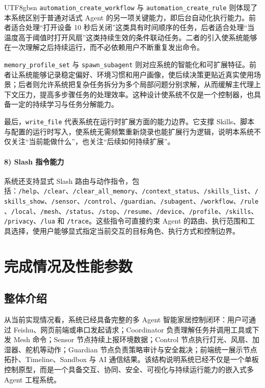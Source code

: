 \documentclass[a4paper,12pt]{article}
\begin{document}
\begin{CJK*}{UTF8}{gbsn}
\texttt{automation\_create\_workflow} 与 \texttt{automation\_create\_rule} 则体现了本系统区别于普通对话式 Agent 的另一项关键能力，即后台自动化执行能力。前者适合处理“打开设备 10 秒后关闭”这类具有时间顺序的任务，后者适合处理“当温度高于阈值时打开风扇”这类持续生效的条件联动任务。二者的引入使系统能够在一次理解之后持续运行，而不必依赖用户不断重复发出命令。

\texttt{memory\_profile\_set} 与 \texttt{spawn\_subagent} 则对应系统的智能化和可扩展特征。前者让系统能够记录稳定偏好、环境习惯和用户画像，使后续决策更贴近真实使用场景；后者则允许系统把复杂任务拆分为多个局部问题分别求解，从而缓解主代理上下文压力，提高多步骤任务的处理效率。这种设计使系统不仅是一个控制器，也具备一定的持续学习与任务分解能力。

最后，\texttt{write\_file} 代表系统在运行时扩展方面的能力边界。它支撑 Skills、脚本与配置的运行时写入，使系统无需频繁重新烧录也能扩展行为逻辑，说明本系统不仅关注“当前能做什么”，也关注“后续如何持续扩展”。

\paragraph{8) Slash 指令能力}
系统还支持显式 Slash 路由与动作指令，包括：\texttt{/help}、\texttt{/clear}、\texttt{/clear\_all\_memory}、\texttt{/context\_status}、\texttt{/skills\_list}、\texttt{/skills\_show}、\texttt{/sensor}、\texttt{/control}、\texttt{/guardian}、\texttt{/subagent}、\texttt{/workflow}、\texttt{/rule}、\texttt{/local}、\texttt{/mesh}、\texttt{/status}、\texttt{/stop}、\texttt{/resume}、\texttt{/device}、\texttt{/profile}、\texttt{/skills}、\texttt{/privacy}、\texttt{/lua} 和 \texttt{/trace}。这些指令可直接约束 Agent 的路由、执行范围和工具选择，使用户能够显式指定当前交互的目标角色、执行方式和控制边界。

\section{完成情况及性能参数}

\subsection{整体介绍}
从当前实现情况看，系统已经具备完整的多 Agent 智能家居控制闭环：用户可通过 Feishu、网页前端或串口发起请求；Coordinator 负责理解任务并调用工具或下发 Mesh 命令；Sensor 节点持续上报环境数据；Control 节点执行灯光、风扇、加湿器、舵机等动作；Guardian 节点负责策略审计与安全裁决；前端统一展示节点拓扑、Timeline、Sandbox 与 AI 通信结果。该结构说明系统已经不仅是一个单板控制原型，而是一个具备交互、协同、安全、可视化与持续运行能力的嵌入式多 Agent 工程系统。


\end{CJK*}
\end{document}
